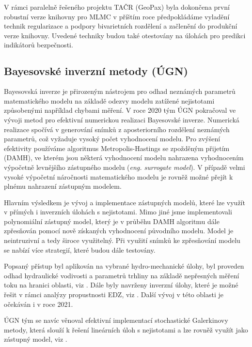 \documentclass[11pt,a4paper]{article}
\begin{document}
\begin{onehalfspacing}
V rámci paralelně řešeného projektu TAČR (GeoPax) byla dokončena první robustní verze knihovny pro MLMC v příštím roce předpokládáme vyladění technik regularizace a podpory bivarietních rozdělení a začlenění do produkční verze knihovny. Uvedené techniky budou také otestovány na 
úlohách pro predikci indikátorů bezpečnosti.

\subsection{Bayesovské inverzní metody (ÚGN)}

Bayesovská inverze je přirozeným nástrojem pro odhad neznámých parametrů matematického modelu na základě odezvy modelu zatížené nejistotami způsobenými například chybami měření. V roce 2020 tým ÚGN pokračoval ve vývoji metod pro efektivní numerickou realizaci Bayesovské inverze. Numerická realizace spočívá v generování snímků  z aposteriorního rozdělení neznámých parametrů, což vyžaduje vysoký počet vyhodnocení modelu. Pro zvýšení efektivity používáme algoritmus Metropolis-Hastings se zpožděným přijetím (DAMH), ve kterém jsou některá vyhodnocení modelu nahrazena vyhodnocením výpočetně levnějšího zástupného modelu ({\it eng. surrogate model}). V případě velmi vysoké výpočetní náročnosti matematického modelu je rovněž možné přejít k plnému nahrazení zástupným modelem.

Hlavním výsledkem je vývoj a implementace zástupných modelů, které lze využít v přímých i inverzních úlohách s nejistotami. Mimo jiné jsme implementovali polynomiální zástupný model, který je v průběhu DAMH algoritmu dále zpřesňován pomocí nově získaných vyhodnocení původního modelu. Model je neintruzivní a tedy široce využitelný. Při využití snímků ke zpřesňování modelu se nabízí více strategií, které budou dále testovány.

Popsaný přístup byl aplikován na vybrané hydro-mechanické úlohy, byl proveden odhad hydraulické vodivosti a parametrů trhliny na základě nepřesných měření toku na hranici oblasti, viz \cite{blaheta2020bayesian, BBDHH2020, berevs2021numerical}. Dále byly navrženy inverzní úlohy, které je možné řešit v rámci analýzy propustnosti EDZ, viz \cite{domesova2021efficient}. Další vývoj v této oblasti je očekáván i v roce 2021.

ÚGN tým se navíc věnoval efektivní implementací stochastické Galerkinovy metody, která slouží k řešení  lineárních úloh s nejistotami a lze rovněž využít jako zástupný model, viz \cite{berevs2020comparison}.



\end{onehalfspacing}
\end{document}
